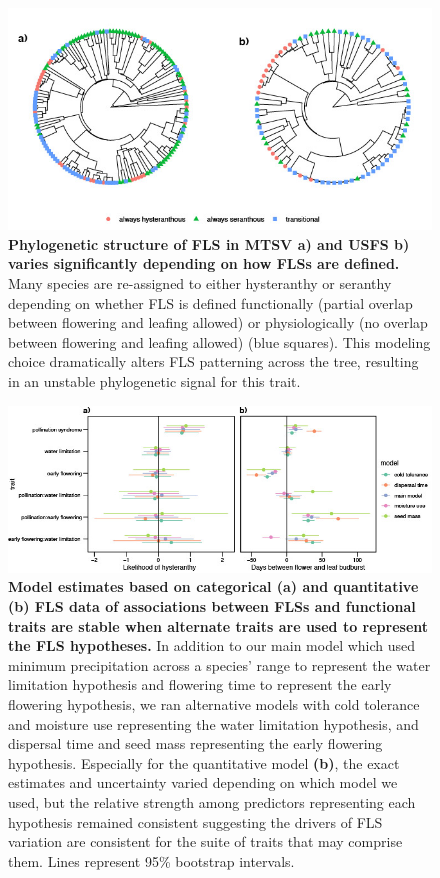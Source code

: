 \documentclass[11pt]{article}
\begin{document}
\begin{figure}[H]
\centering
\includegraphics[width=\textwidth]{..//..//cicletrees.jpg} 
  \caption{\textbf{Phylogenetic structure of FLS in MTSV \textbf{a)} and USFS \textbf{b)} varies significantly depending on how FLSs are defined.} Many species are re-assigned to either hysteranthy or seranthy depending on whether FLS is defined functionally (partial overlap between flowering and leafing allowed) or physiologically (no overlap between flowering and leafing allowed) (blue squares). This modeling choice dramatically alters FLS patterning across the tree, resulting in an unstable phylogenetic signal for this trait.}
    \label{fig:phylogeny}
    \end{figure}
\begin{figure}[H]
\centering
\includegraphics[width=\textwidth]{..//..//alternatepredictors.jpg} 
  \caption{\textbf{Model estimates based on categorical (a) and quantitative (b) FLS data of associations between FLSs and functional traits are stable when alternate traits are used to represent the FLS hypotheses.} In addition to our main model which used minimum precipitation across a species' range to represent the water limitation hypothesis and flowering time to represent the early flowering hypothesis, we ran alternative models with cold tolerance and moisture use representing the water limitation hypothesis, and dispersal time and seed mass representing the early flowering hypothesis. Especially for the quantitative model \textbf{(b)}, the exact estimates and uncertainty varied depending on which model we used, but the relative strength among predictors representing each hypothesis remained consistent suggesting the drivers of FLS variation are consistent for the suite of traits that may comprise them. Lines represent 95\% bootstrap intervals.} 
    \label{fig:altpreds}
    \end{figure}
    
\end{document}
